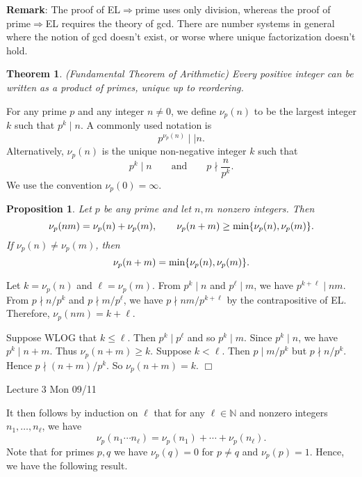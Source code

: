 \documentclass{article}
\def\min{{\rm min}}
\def\N{{\mathbb N}}
\newtheorem{theorem}[subsection]{Theorem}
\newtheorem{proposition}[subsection]{Proposition}
\newenvironment{proof}{\noindent {\bf Proof:}}{$\Box$ \vspace{2 ex}}
\newcommand{\add}[1]{{\color{blue} #1}}
\begin{document}
\noindent\textbf{Remark}: The proof of EL$\Rightarrow$prime uses only division, whereas the proof of prime$\Rightarrow$EL requires the theory of gcd. There are number systems in general where the notion of gcd doesn't exist, or worse where unique factorization doesn't hold.

\begin{theorem}
(Fundamental Theorem of Arithmetic) Every positive integer can be written as a product of primes, unique up to reordering.
\end{theorem}

For any prime $p$ and any integer $n\neq 0$, we define $\nu_p(n)$ to be the largest integer $k$ such that $p^k\mid n$. A commonly used notation is
$$p^{\nu_p(n)} \mid\mid n.$$
Alternatively, $\nu_p(n)$ is the unique non-negative integer $k$ such that
$$p^k\mid n\qquad\mbox{and}\qquad p\nmid\frac{n}{p^k}.$$
We use the convention $\nu_p(0) = \infty$.



\begin{proposition}
    Let $p$ be any prime and let $n,m$ nonzero integers. Then
    $$\nu_p(nm) = \nu_p(n) + \nu_p(m),\qquad \nu_p(n+m) \geq \min\{\nu_p(n),\nu_p(m)\}.$$
    If $\nu_p(n)\neq \nu_p(m)$, then $$\nu_p(n+m) = \min\{\nu_p(n),\nu_p(m)\}.$$
\end{proposition}

\begin{proof}
    Let $k = \nu_p(n)$ and $\ell = \nu_p(m)$. From $p^k\mid n$ and $p^\ell\mid m$, we have $p^{k+\ell}\mid nm$. From $p\nmid n/p^k$ and $p\nmid m/p^\ell$, we have $p\nmid nm/p^{k+\ell}$ by the contrapositive of EL. Therefore, $\nu_p(nm) = k + \ell$.

    Suppose WLOG that $k\leq \ell$. Then $p^k\mid p^\ell$ and so $p^k\mid m$. Since $p^k\mid n$, we have $p^k\mid n+m$. Thus $\nu_p(n+m)\geq k$. Suppose $k<\ell$. Then $p\mid m/p^k$ but $p\nmid n/p^k$. Hence $p\nmid (n+m)/p^k$. So $\nu_p(n+m) = k$.
\end{proof}

\begin{center}
    \add{Lecture 3 Mon 09/11}
\end{center}

It then follows by induction on $\ell$ that for any $\ell\in\N$ and nonzero integers $n_1,\ldots,n_\ell$, we have
$$\nu_p(n_1\cdots n_\ell) = \nu_p(n_1) + \cdots + \nu_p(n_\ell).$$
Note that for primes $p,q$ we have $\nu_p(q) = 0$ for $p\neq q$ and $\nu_p(p) = 1$. Hence, we have the following result.
\end{document}
